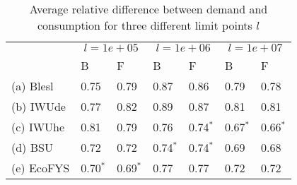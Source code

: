 \begin{table}[htb]
\centering
\caption{Average relative difference between demand and consumption
for three different limit points $l$ }
\label{tab:diff}
\begin{tabular}{l ll ll ll}
\toprule
 & \multicolumn{2}{c}{$l = 1e+05$} 
 & \multicolumn{2}{c}{$l = 1e+06$} 
 & \multicolumn{2}{c}{$l = 1e+07$} 
   \\
& B & F & B & F & B & F\\
\midrule

(a) Blesl  &  0.75 &  0.79 &  0.87 &  0.86 &  0.79 &  0.78 \\
(b) IWUde  &  0.77 &  0.82 &  0.89 &  0.87 &  0.81 &  0.81 \\
(c) IWUhe  &  0.81 &  0.79 &  0.76 &  0.74$^*$ &  0.67$^*$ &  0.66$^*$ \\
(d) BSU    &  0.72 &  0.72 &  0.74$^*$ &  0.74$^*$ &  0.69 &  0.68 \\
(e) EcoFYS &  0.70$^*$ &  0.69$^*$ &  0.77 &  0.77 &  0.72 &  0.72 \\

\bottomrule
\end{tabular}
\end{table}

